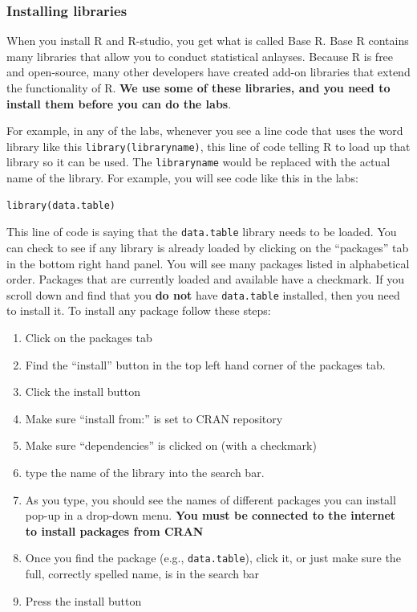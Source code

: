 \documentclass[
]{book}
\providecommand{\tightlist}{%
  \setlength{\itemsep}{0pt}\setlength{\parskip}{0pt}}
\begin{document}
\hypertarget{installing-libraries}{%
\subsubsection{Installing libraries}\label{installing-libraries}}

When you install R and R-studio, you get what is called Base R. Base R contains many libraries that allow you to conduct statistical anlayses. Because R is free and open-source, many other developers have created add-on libraries that extend the functionality of R. \textbf{We use some of these libraries, and you need to install them before you can do the labs}.

For example, in any of the labs, whenever you see a line code that uses the word library like this \texttt{library(libraryname)}, this line of code telling R to load up that library so it can be used. The \texttt{libraryname} would be replaced with the actual name of the library. For example, you will see code like this in the labs:

\begin{verbatim}
library(data.table)
\end{verbatim}

This line of code is saying that the \texttt{data.table} library needs to be loaded. You can check to see if any library is already loaded by clicking on the ``packages'' tab in the bottom right hand panel. You will see many packages listed in alphabetical order. Packages that are currently loaded and available have a checkmark. If you scroll down and find that you \textbf{do not} have \texttt{data.table} installed, then you need to install it. To install any package follow these steps:

\begin{enumerate}
\def\labelenumi{\arabic{enumi}.}
\tightlist
\item
  Click on the packages tab
\item
  Find the ``install'' button in the top left hand corner of the packages tab.
\item
  Click the install button
\item
  Make sure ``install from:'' is set to CRAN repository
\item
  Make sure ``dependencies'' is clicked on (with a checkmark)
\item
  type the name of the library into the search bar.
\item
  As you type, you should see the names of different packages you can install pop-up in a drop-down menu. \textbf{You must be connected to the internet to install packages from CRAN}
\item
  Once you find the package (e.g., \texttt{data.table}), click it, or just make sure the full, correctly spelled name, is in the search bar
\item
  Press the install button
\end{enumerate}
\end{document}
